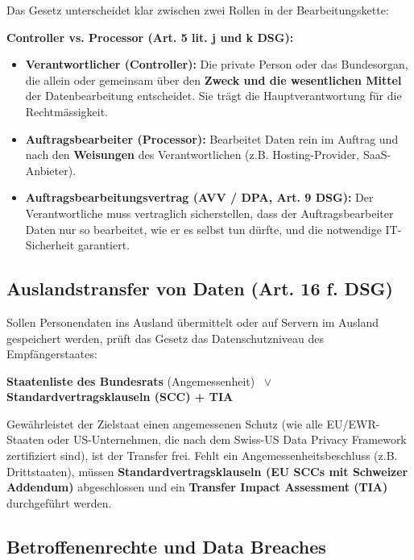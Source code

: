 Das Gesetz unterscheidet klar zwischen zwei Rollen in der Bearbeitungskette:

\begin{definition}
    \textbf{Controller vs. Processor (Art. 5 lit. j und k DSG):}
    \begin{itemize}
        \item \textbf{Verantwortlicher (Controller):} Die private Person oder das Bundesorgan, die allein oder gemeinsam über den \textbf{Zweck und die wesentlichen Mittel} der Datenbearbeitung entscheidet. Sie trägt die Hauptverantwortung für die Rechtmässigkeit.
        \item \textbf{Auftragsbearbeiter (Processor):} Bearbeitet Daten rein im Auftrag und nach den \textbf{Weisungen} des Verantwortlichen (z.B. Hosting-Provider, SaaS-Anbieter).
        \item \textbf{Auftragsbearbeitungsvertrag (AVV / DPA, Art. 9 DSG):} Der Verantwortliche muss vertraglich sicherstellen, dass der Auftragsbearbeiter Daten nur so bearbeitet, wie er es selbst tun dürfte, und die notwendige IT-Sicherheit garantiert.
    \end{itemize}
\end{definition}

\subsection{Auslandstransfer von Daten (Art. 16 f. DSG)}

Sollen Personendaten ins Ausland übermittelt oder auf Servern im Ausland gespeichert werden, prüft das Gesetz das Datenschutzniveau des Empfängerstaates:
\begin{center}
    \textbf{Staatenliste des Bundesrats} (Angemessenheit) $\;\lor\;$ \textbf{Standardvertragsklauseln (SCC) + TIA}
\end{center}

Gewährleistet der Zielstaat einen angemessenen Schutz (wie alle EU/EWR-Staaten oder US-Unternehmen, die nach dem Swiss-US Data Privacy Framework zertifiziert sind), ist der Transfer frei. Fehlt ein Angemessenheitsbeschluss (z.B. Drittstaaten), müssen \textbf{Standardvertragsklauseln (EU SCCs mit Schweizer Addendum)} abgeschlossen und ein \textbf{Transfer Impact Assessment (TIA)} durchgeführt werden.

\subsection{Betroffenenrechte und Data Breaches}

